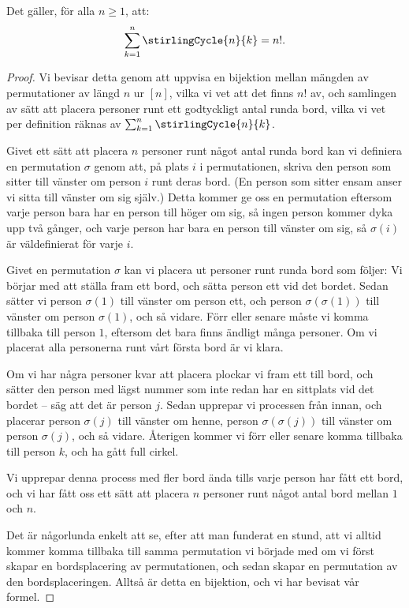 \documentclass[nobib]{tufte-handout}
\begin{document}
\begin{theorem}
  Det gäller, för alla $n \geq 1$, att: 
  $$\sum_{k=1}^{n} \stirlingCycle{n}{k} = n!.$$

  \begin{proof}
    Vi bevisar detta genom att uppvisa en bijektion mellan mängden av permutationer av längd $n$ ur $[n]$, vilka vi vet att det finns $n!$ av, och samlingen av sätt att placera personer runt ett godtyckligt antal runda bord, vilka vi vet per definition räknas av $\sum_{k=1}^{n} \stirlingCycle{n}{k}$.



    Givet ett sätt att placera $n$ personer runt något antal runda bord kan vi definiera en permutation $\sigma$ genom att, på plats $i$ i permutationen, skriva den person som sitter till vänster om person $i$ runt deras bord. (En person som sitter ensam anser vi sitta till vänster om sig själv.) Detta kommer ge oss en permutation eftersom varje person bara har en person till höger om sig, så ingen person kommer dyka upp två gånger, och varje person har bara en person till vänster om sig, så $\sigma(i)$ är väldefinierat för varje $i$.

    Givet en permutation $\sigma$ kan vi placera ut personer runt runda bord som följer: Vi börjar med att ställa fram ett bord, och sätta person ett vid det bordet. Sedan sätter vi person $\sigma(1)$ till vänster om person ett, och person $\sigma(\sigma(1))$ till vänster om person $\sigma(1)$, och så vidare. Förr eller senare måste vi komma tillbaka till person $1$, eftersom det bara finns ändligt många personer. Om vi placerat alla personerna runt vårt första bord är vi klara.

    Om vi har några personer kvar att placera plockar vi fram ett till bord, och sätter den person med lägst nummer som inte redan har en sittplats vid det bordet -- säg att det är person $j$. Sedan upprepar vi processen från innan, och placerar person $\sigma(j)$ till vänster om henne, person $\sigma(\sigma(j))$ till vänster om person $\sigma(j)$, och så vidare. Återigen kommer vi förr eller senare komma tillbaka till person $k$, och ha gått full cirkel.

    Vi upprepar denna process med fler bord ända tills varje person har fått ett bord, och vi har fått oss ett sätt att placera $n$ personer runt något antal bord mellan $1$ och $n$.

    Det är någorlunda enkelt att se, efter att man funderat en stund, att vi alltid kommer komma tillbaka till samma permutation vi började med om vi först skapar en bordsplacering av permutationen, och sedan skapar en permutation av den bordsplaceringen. Alltså är detta en bijektion, och vi har bevisat vår formel.
  \end{proof}
\end{theorem}
\end{document}
